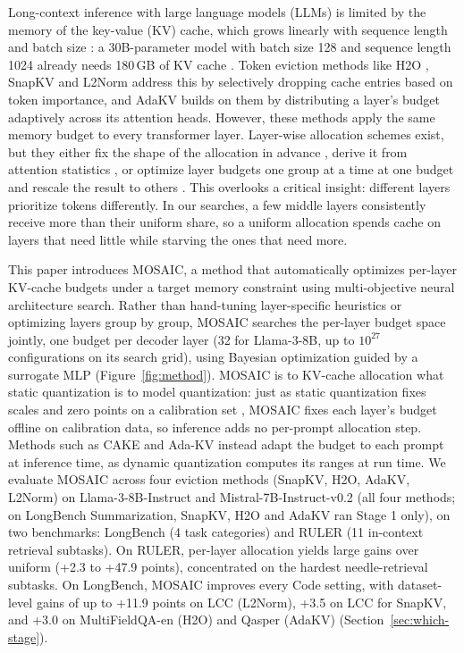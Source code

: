 \documentclass[11pt]{article}
\begin{document}
Long-context inference with large language models (LLMs) is limited by the memory of the key-value (KV) cache, which grows linearly with sequence length and batch size \citep{kwon2023pagedattention}: a 30B-parameter model with batch size 128 and sequence length 1024 already needs 180\,GB of KV cache \citep{zhang2023h2o}. Token eviction methods like H2O \citep{zhang2023h2o}, SnapKV \citep{li2024snapkv} and L2Norm \citep{devoto2024l2norm} address this by selectively dropping cache entries based on token importance, and AdaKV \citep{feng2025adakv} builds on them by distributing a layer's budget adaptively across its attention heads. However, these methods apply the same memory budget to every transformer layer. Layer-wise allocation schemes exist, but they either fix the shape of the allocation in advance \citep{cai2025pyramidkv}, derive it from attention statistics \citep{qin2025cake}, or optimize layer budgets one group at a time at one budget and rescale the result to others \citep{yu2025evolkv}. This overlooks a critical insight: different layers prioritize tokens differently. In our searches, a few middle layers consistently receive more than their uniform share, so a uniform allocation spends cache on layers that need little while starving the ones that need more.

This paper introduces MOSAIC, a method that automatically optimizes per-layer KV-cache budgets under a target memory constraint using multi-objective neural architecture search. Rather than hand-tuning layer-specific heuristics or optimizing layers group by group, MOSAIC searches the per-layer budget space jointly, one budget per decoder layer (32 for Llama-3-8B, up to $10^{27}$ configurations on its search grid), using Bayesian optimization guided by a surrogate MLP (Figure~\ref{fig:method}). MOSAIC is to KV-cache allocation what static quantization is to model quantization: just as static quantization fixes scales and zero points on a calibration set \citep{xiao2023smoothquant,frantar2023gptq}, MOSAIC fixes each layer's budget offline on calibration data, so inference adds no per-prompt allocation step. Methods such as CAKE and Ada-KV instead adapt the budget to each prompt at inference time, as dynamic quantization computes its ranges at run time. We evaluate MOSAIC across four eviction methods (SnapKV, H2O, AdaKV, L2Norm) on Llama-3-8B-Instruct and Mistral-7B-Instruct-v0.2 (all four methods; on LongBench Summarization, SnapKV, H2O and AdaKV ran Stage 1 only), on two benchmarks: LongBench (4 task categories) and RULER (11 in-context retrieval subtasks). On RULER, per-layer allocation yields large gains over uniform (+2.3 to +47.9 points), concentrated on the hardest needle-retrieval subtasks. On LongBench, MOSAIC improves every Code setting, with dataset-level gains of up to +11.9 points on LCC (L2Norm), +3.5 on LCC for SnapKV, and +3.0 on MultiFieldQA-en (H2O) and Qasper (AdaKV) (Section~\ref{sec:which-stage}).
\end{document}
